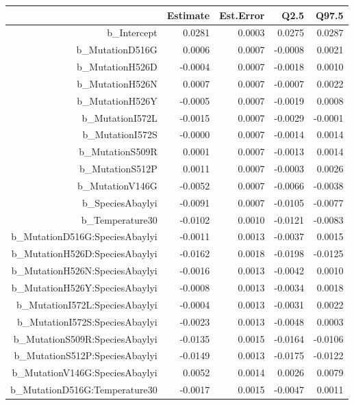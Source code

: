 \begin{table}[ht]
\centering
\begingroup\footnotesize
\begin{tabular}{rrrrr}
  \hline
 & Estimate & Est.Error & Q2.5 & Q97.5 \\ 
  \hline
b\_Intercept & 0.0281 & 0.0003 & 0.0275 & 0.0287 \\ 
  b\_MutationD516G & 0.0006 & 0.0007 & -0.0008 & 0.0021 \\ 
  b\_MutationH526D & -0.0004 & 0.0007 & -0.0018 & 0.0010 \\ 
  b\_MutationH526N & 0.0007 & 0.0007 & -0.0007 & 0.0022 \\ 
  b\_MutationH526Y & -0.0005 & 0.0007 & -0.0019 & 0.0008 \\ 
  b\_MutationI572L & -0.0015 & 0.0007 & -0.0029 & -0.0001 \\ 
  b\_MutationI572S & -0.0000 & 0.0007 & -0.0014 & 0.0014 \\ 
  b\_MutationS509R & 0.0001 & 0.0007 & -0.0013 & 0.0014 \\ 
  b\_MutationS512P & 0.0011 & 0.0007 & -0.0003 & 0.0026 \\ 
  b\_MutationV146G & -0.0052 & 0.0007 & -0.0066 & -0.0038 \\ 
  b\_SpeciesAbaylyi & -0.0091 & 0.0007 & -0.0105 & -0.0077 \\ 
  b\_Temperature30 & -0.0102 & 0.0010 & -0.0121 & -0.0083 \\ 
  b\_MutationD516G:SpeciesAbaylyi & -0.0011 & 0.0013 & -0.0037 & 0.0015 \\ 
  b\_MutationH526D:SpeciesAbaylyi & -0.0162 & 0.0018 & -0.0198 & -0.0125 \\ 
  b\_MutationH526N:SpeciesAbaylyi & -0.0016 & 0.0013 & -0.0042 & 0.0010 \\ 
  b\_MutationH526Y:SpeciesAbaylyi & -0.0008 & 0.0013 & -0.0034 & 0.0018 \\ 
  b\_MutationI572L:SpeciesAbaylyi & -0.0004 & 0.0013 & -0.0031 & 0.0022 \\ 
  b\_MutationI572S:SpeciesAbaylyi & -0.0023 & 0.0013 & -0.0048 & 0.0003 \\ 
  b\_MutationS509R:SpeciesAbaylyi & -0.0135 & 0.0015 & -0.0164 & -0.0106 \\ 
  b\_MutationS512P:SpeciesAbaylyi & -0.0149 & 0.0013 & -0.0175 & -0.0122 \\ 
  b\_MutationV146G:SpeciesAbaylyi & 0.0052 & 0.0014 & 0.0026 & 0.0079 \\ 
  b\_MutationD516G:Temperature30 & -0.0017 & 0.0015 & -0.0047 & 0.0011 \\ 

\end{tabular}
\end{table}
